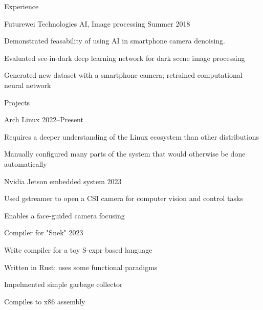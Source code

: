 \begin{rSection}{Experience}
		\begin{rSubsection}{Futurewei Technologies} {AI, Image processing} {Summer 2018}
			\item Demonstrated feasability of using AI in smartphone camera denoising.
			\item Evaluated see-in-dark deep learning network for dark scene image processing
			\item Generated new dataset with a smartphone camera; retrained computational neural network
		\end{rSubsection}

	\end{rSection}

	
	\begin{rSection}{Projects}

		{\smallskip} %

		\begin{multicols}{2}
		

			\begin{rSubsection}{Arch Linux} {} {2022--Present}
				\item Requires a deeper understanding of the Linux ecosystem than other distributions
				\item Manually configured many parts of the system that would otherwise be done automatically
			\end{rSubsection}

			\begin{rSubsection}{Nvidia Jetson embedded system} {} {2023}
				\item Used gstreamer to open a CSI camera for computer vision and control tasks
				\item Enables a face-guided camera focusing
			\end{rSubsection}

			\begin{rSubsection}{Compiler for "Snek"} {} {2023}
				\item Write compiler for a toy S-expr based language
				\item Written in Rust; uses some functional paradigms
				\item Impelmented simple garbage collector
				\item Compiles to x86 assembly
			\end{rSubsection}


\end{multicols}
\end{rSection}
